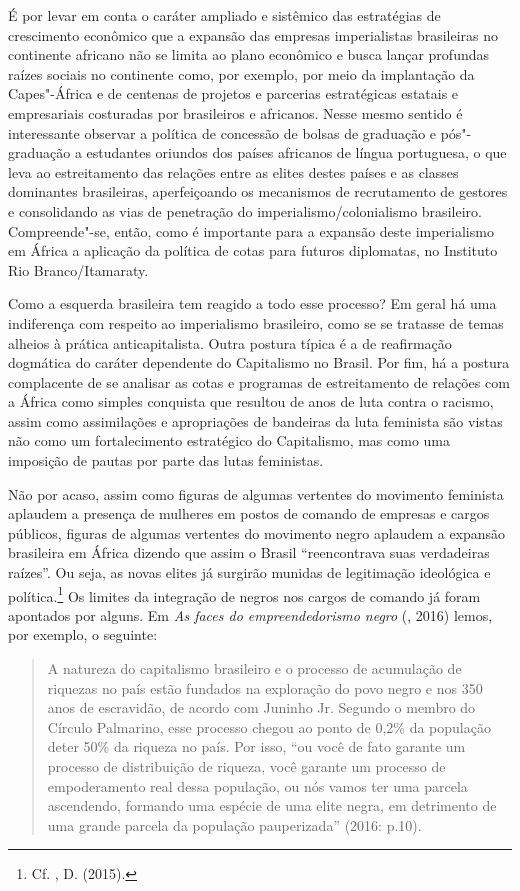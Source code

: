 É por levar em conta o caráter ampliado e sistêmico das estratégias de
crescimento econômico que a expansão das empresas imperialistas
brasileiras no continente africano não se limita ao plano econômico e
busca lançar profundas raízes sociais no continente como, por exemplo,
por meio da implantação da Capes"-África e de centenas de projetos e
parcerias estratégicas estatais e empresariais costuradas por
brasileiros e africanos. Nesse mesmo sentido é interessante observar a
política de concessão de bolsas de graduação e pós"-graduação a
estudantes oriundos dos países africanos de língua portuguesa, o que
leva ao estreitamento das relações entre as elites destes países e as
classes dominantes brasileiras, aperfeiçoando os mecanismos de
recrutamento de gestores e consolidando as vias de penetração do
imperialismo/colonialismo brasileiro. Compreende"-se, então, como é
importante para a expansão deste imperialismo em África a aplicação da
política de cotas para futuros diplomatas, no Instituto Rio
Branco/Itamaraty.

Como a esquerda brasileira tem reagido a todo esse processo? Em geral há
uma indiferença com respeito ao imperialismo brasileiro, como se se
tratasse de temas alheios à prática anticapitalista. Outra postura
típica é a de reafirmação dogmática do caráter dependente do Capitalismo
no Brasil. Por fim, há a postura complacente de se analisar as cotas e
programas de estreitamento de relações com a África como simples
conquista que resultou de anos de luta contra o racismo, assim como
assimilações e apropriações de bandeiras da luta feminista são vistas
não como um fortalecimento estratégico do Capitalismo, mas como uma
imposição de pautas por parte das lutas feministas.

Não por acaso, assim como figuras de algumas vertentes do movimento
feminista aplaudem a presença de mulheres em postos de comando de
empresas e cargos públicos, figuras de algumas vertentes do movimento
negro aplaudem a expansão brasileira em África dizendo que assim o
Brasil ``reencontrava suas verdadeiras raízes''. Ou seja, as novas
elites já surgirão munidas de legitimação ideológica e
política.\footnote{Cf. , D. (2015).} Os limites da integração de
negros nos cargos de comando já foram apontados por alguns. Em \emph{As
faces do empreendedorismo negro} (, 2016) lemos, por exemplo, o
seguinte:

\begin{quote}
A natureza do capitalismo brasileiro e o processo de acumulação de
riquezas no país estão fundados na exploração do povo negro e nos 350
anos de escravidão, de acordo com Juninho Jr. Segundo o membro do
Círculo Palmarino, esse processo chegou ao ponto de 0,2\% da população
deter 50\% da riqueza no país. Por isso, ``ou você de fato garante um
processo de distribuição de riqueza, você garante um processo de
empoderamento real dessa população, ou nós vamos ter uma parcela
ascendendo, formando uma espécie de uma elite negra, em detrimento de
uma grande parcela da população pauperizada'' (2016: p.10).
\end{quote}

